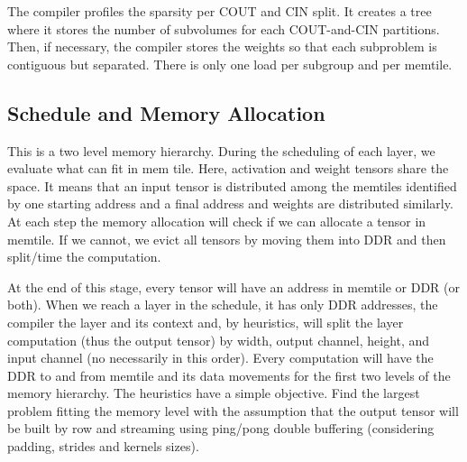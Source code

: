 \documentclass[conference]{IEEEtran}
\begin{document}
The compiler profiles the sparsity per COUT and CIN split. It creates
a tree where it stores the number of subvolumes for each COUT-and-CIN
partitions. Then, if necessary, the compiler stores the weights so that
each subproblem is contiguous but separated. There is only one load
per subgroup and per memtile.


\subsection{Schedule and Memory Allocation}
This is a two level memory hierarchy. During the scheduling of each
layer, we evaluate what can fit in mem tile. Here, activation and
weight tensors share the space. It means that an input tensor is
distributed among the memtiles identified by one starting address and
a final address and weights are distributed similarly. At each step
the memory allocation will check if we can allocate a tensor in
memtile. If we cannot, we evict all tensors by moving them into DDR
and then split/time the computation.


At the end of this stage, every tensor will have an address in memtile
or DDR (or both). When we reach a layer in the schedule, it has only
DDR addresses, the compiler the layer and its context and, by
heuristics, will split the layer computation (thus the output tensor)
by width, output channel, height, and input channel (no necessarily in
this order). Every computation will have the DDR to and from memtile
and its data movements for the first two levels of the memory
hierarchy. The heuristics have a simple objective. Find the largest
problem fitting the memory level with the assumption that the output
tensor will be built by row and streaming using ping/pong double
buffering (considering padding, strides and kernels sizes).
\end{document}
